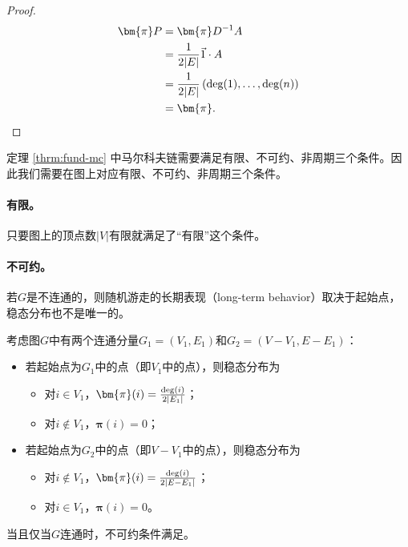 \documentclass[lang=cn,newtx,10pt,scheme=chinese,chinesefont=nofont,citestyle=gb7714-2015, bibstyle=gb7714-2015]{elegantbook}
\begin{document}
\begin{refsection}
\begin{lemma}
    \begin{proof}
        \begin{align*}
            \bm{\pi}P&=\bm{\pi}D^{-1}A\\
            &=\frac{1}{2|E|}\vec{1}\cdot  A\\
            &=\frac{1}{2|E|}\left(\textup{deg}(1),\dots,\textup{deg}(n)\right)\\
            &=\bm{\pi}.
        \end{align*}
    \end{proof}
\end{lemma}

定理 \ref{thrm:fund-mc} 中马尔科夫链需要满足有限、不可约、非周期三个条件。因此我们需要在图上对应有限、不可约、非周期三个条件。

\paragraph{有限。}只要图上的顶点数$|V|$有限就满足了“有限”这个条件。

\paragraph{不可约。}若$G$是不连通的，则随机游走的长期表现（long-term behavior）取决于起始点，稳态分布也不是唯一的。
        
考虑图$G$中有两个连通分量$G_1=(V_1,E_1)$和$G_2=(V-V_1,E-E_1)$：
\begin{itemize}
    \item 若起始点为$G_1$中的点（即$V_1$中的点），则稳态分布为
    \begin{itemize}
        \item 对$i\in V_1$，$\bm{\pi}(i)=\frac{\textup{deg}(i)}{2|E_1|}$；
        \item 对$i\notin V_1$，$\bm{\pi}(i)=0$；
    \end{itemize}

    \item 若起始点为$G_2$中的点（即$V-V_1$中的点），则稳态分布为
    \begin{itemize}
        \item 对$i\notin V_1$，$\bm{\pi}(i)=\frac{\textup{deg}(i)}{2|E-E_1|}$；
        \item 对$i\in V_1$，$\bm{\pi}(i)=0$。
    \end{itemize}
\end{itemize}

\begin{fact}
    \label{fact:irre-graph}
    当且仅当$G$连通时，不可约条件满足。
\end{fact}


\end{refsection}
\end{document}
